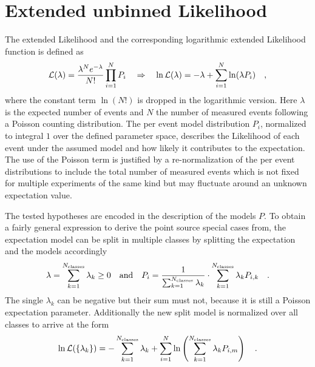 \section{Extended unbinned Likelihood}
The extended Likelihood  and the corresponding logarithmic extended Likelihood function is defined as
\begin{equation}
  \mathcal{L}(\lambda) = \frac{\lambda^N e^{-\lambda}}{N!}\prod_{i=1}^N P_i
  \quad\Rightarrow\quad
    \ln\mathcal{L}(\lambda) = -\lambda+\sum_{i=1}^N \ln(\lambda P_i)
  \quad\text{,}
\end{equation}
where the constant term $\ln(N!)$ is dropped in the logarithmic version.
Here $\lambda$ is the expected number of events and $N$ the number of measured events following a Poisson counting distribution.
The per event model distribution $P_i$, normalized to integral $1$ over the defined parameter space, describes the Likelihood of each event under the assumed model and how likely it contributes to the expectation.
The use of the Poisson term is justified by a re-normalization of the per event distributions to include the total number of measured events which is not fixed for multiple experiments of the same kind but may fluctuate around an unknown expectation value.

The tested hypotheses are encoded in the description of the models $P$.
To obtain a fairly general expression to derive the point source special cases from, the expectation model can be split in multiple classes by splitting the expectation and the models accordingly
\begin{equation}
  \lambda = \sum_{k=1}^{N_\text{classes}} \lambda_k \geq 0
  \quad\text{and}\quad
  P_i = \frac{1}{\sum_{k=1}^{N_\text{classes}} \lambda_k}\cdot
         \sum_{k=1}^{N_\text{classes}} \lambda_k P_{i,k}
  \quad\text{.}
\end{equation}
The single $\lambda_k$ can be negative but their sum must not, because it is still a Poisson expectation parameter.
Additionally the new split model is normalized over all classes to arrive at the form
\begin{equation}
  \ln\mathcal{L}(\{\lambda_k\})
  = -\sum_{k=1}^{N_\text{classes}} \lambda_k +
    \sum_{i=1}^N \ln\left(\sum_{k=1}^{N_\text{classes}}
      \lambda_k P_{i,m} \right)
  \quad\text{.}
\end{equation}

